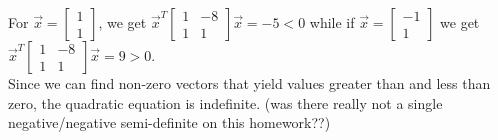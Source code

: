 \documentclass[12pt]{extarticle}
\theoremstyle{definition}
\begin{document}
\begin{problem}
		For $\vec{x} = \begin{bmatrix} 1 \\ 1 \end{bmatrix}$, we get $\vec{x}^T \begin{bmatrix}1 & -8\\ 1 & 1 \end{bmatrix}\vec{x} = -5 < 0$ 
		while if $\vec{x} = \begin{bmatrix} -1 \\ 1 \end{bmatrix}$ we get $\vec{x}^T \begin{bmatrix}1 & -8\\ 1 & 1 \end{bmatrix}\vec{x} = 9 > 0$.\\

		Since we can find non-zero vectors that yield values greater than and less than zero, the quadratic equation is indefinite. (was there really not a single negative/negative semi-definite on this homework??)

\end{problem}


\small


\end{document}
